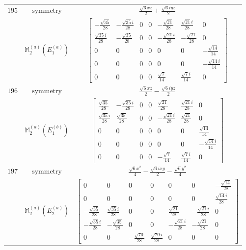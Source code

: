 \documentclass[fleqn,8pt,landscape]{jsarticle}
\begin{document}
\begin{longtable}{ccc}
$ 195 $ & $ \text{symmetry} $ & $ \frac{\sqrt{6} x z}{2} + \frac{\sqrt{6} i y z}{2} $ \\
$  $ & $ \mathbb{M}_{2}^{(a)}(E_{1}^{(a)}) $ & $ \begin{bmatrix} - \frac{\sqrt{35}}{28} & - \frac{\sqrt{35} i}{28} & 0 & 0 & - \frac{\sqrt{21}}{28} & \frac{\sqrt{21} i}{28} & 0 \\ \frac{\sqrt{35} i}{28} & - \frac{\sqrt{35}}{28} & 0 & 0 & - \frac{\sqrt{21} i}{28} & - \frac{\sqrt{21}}{28} & 0 \\ 0 & 0 & 0 & 0 & 0 & 0 & - \frac{\sqrt{14}}{14} \\ 0 & 0 & 0 & 0 & 0 & 0 & - \frac{\sqrt{14} i}{14} \\ 0 & 0 & 0 & 0 & \frac{\sqrt{7}}{14} & \frac{\sqrt{7} i}{14} & 0 \end{bmatrix} $ \\ \hline
$ 196 $ & $ \text{symmetry} $ & $ \frac{\sqrt{6} x z}{2} - \frac{\sqrt{6} i y z}{2} $ \\
$  $ & $ \mathbb{M}_{2}^{(a)}(E_{1}^{(b)}) $ & $ \begin{bmatrix} \frac{\sqrt{35}}{28} & - \frac{\sqrt{35} i}{28} & 0 & 0 & \frac{\sqrt{21}}{28} & \frac{\sqrt{21} i}{28} & 0 \\ \frac{\sqrt{35} i}{28} & \frac{\sqrt{35}}{28} & 0 & 0 & - \frac{\sqrt{21} i}{28} & \frac{\sqrt{21}}{28} & 0 \\ 0 & 0 & 0 & 0 & 0 & 0 & \frac{\sqrt{14}}{14} \\ 0 & 0 & 0 & 0 & 0 & 0 & - \frac{\sqrt{14} i}{14} \\ 0 & 0 & 0 & 0 & - \frac{\sqrt{7}}{14} & \frac{\sqrt{7} i}{14} & 0 \end{bmatrix} $ \\ \hline
$ 197 $ & $ \text{symmetry} $ & $ \frac{\sqrt{6} x^{2}}{4} - \frac{\sqrt{6} i x y}{2} - \frac{\sqrt{6} y^{2}}{4} $ \\
$  $ & $ \mathbb{M}_{2}^{(a)}(E_{2}^{(a)}) $ & $ \begin{bmatrix} 0 & 0 & 0 & 0 & 0 & 0 & - \frac{\sqrt{14}}{28} \\ 0 & 0 & 0 & 0 & 0 & 0 & \frac{\sqrt{14} i}{28} \\ - \frac{\sqrt{35}}{28} & \frac{\sqrt{35} i}{28} & 0 & 0 & \frac{\sqrt{21}}{28} & - \frac{\sqrt{21} i}{28} & 0 \\ - \frac{\sqrt{35} i}{28} & - \frac{\sqrt{35}}{28} & 0 & 0 & - \frac{\sqrt{21} i}{28} & - \frac{\sqrt{21}}{28} & 0 \\ 0 & 0 & - \frac{\sqrt{70}}{28} & \frac{\sqrt{70} i}{28} & 0 & 0 & 0 \end{bmatrix} $ \\ \hline

\end{longtable}
\end{document}
